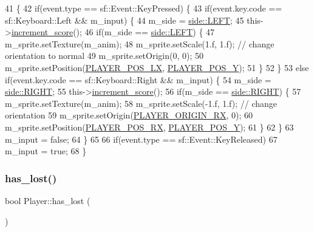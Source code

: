 \begin{DoxyCode}
41                                         \{
42     \textcolor{keywordflow}{if}(event.type == sf::Event::KeyPressed) \{
43         \textcolor{keywordflow}{if}(event.key.code == sf::Keyboard::Left && m\_input) \{
44             m\_side = \hyperlink{assets_8h_afc015eff6557e84151d2e53b94375445a684d325a7303f52e64011467ff5c5758}{side::LEFT};
45             this->\hyperlink{class_player_ab58df1547917c39756f063b0d57a1793}{increment\_score}();               
46             \textcolor{keywordflow}{if}(m\_side == \hyperlink{assets_8h_afc015eff6557e84151d2e53b94375445a684d325a7303f52e64011467ff5c5758}{side::LEFT}) \{
47                 m\_sprite.setTexture(m\_anim);
48                 m\_sprite.setScale(1.f, 1.f); \textcolor{comment}{// change orientation to normal}
49                 m\_sprite.setOrigin(0, 0);
50                 m\_sprite.setPosition(\hyperlink{player_8h_ac5c27f8ceb9550dd92443cd00605dc3e}{PLAYER\_POS\_LX}, \hyperlink{player_8h_a23e4a20c724cefdd69b13c2826a8c12f}{PLAYER\_POS\_Y});
51             \}
52         \}
53         \textcolor{keywordflow}{else} \textcolor{keywordflow}{if}(event.key.code == sf::Keyboard::Right && m\_input) \{
54             m\_side = \hyperlink{assets_8h_afc015eff6557e84151d2e53b94375445a21507b40c80068eda19865706fdc2403}{side::RIGHT};
55             this->\hyperlink{class_player_ab58df1547917c39756f063b0d57a1793}{increment\_score}();
56             \textcolor{keywordflow}{if}(m\_side == \hyperlink{assets_8h_afc015eff6557e84151d2e53b94375445a21507b40c80068eda19865706fdc2403}{side::RIGHT}) \{
57                 m\_sprite.setTexture(m\_anim);
58                 m\_sprite.setScale(-1.f, 1.f); \textcolor{comment}{// change orientation}
59                 m\_sprite.setOrigin(\hyperlink{player_8h_a654c17427cd994ed8ba0206bda8557cf}{PLAYER\_ORIGIN\_RX}, 0);
60                 m\_sprite.setPosition(\hyperlink{player_8h_af87a8f30ac734fbe3fcd0572bd0634d4}{PLAYER\_POS\_RX}, \hyperlink{player_8h_a23e4a20c724cefdd69b13c2826a8c12f}{PLAYER\_POS\_Y});
61             \}
62         \}
63         m\_input = \textcolor{keyword}{false};
64     \}
65 
66     \textcolor{keywordflow}{if}(event.type == sf::Event::KeyReleased)
67         m\_input = \textcolor{keyword}{true};
68 \}
\end{DoxyCode}
\mbox{\label{class_player_a734ead9fd1aa89c2574310425da18dc7}} 
\subsubsection{\texorpdfstring{has\+\_\+lost()}{has\_lost()}}
{\footnotesize\ttfamily bool Player\+::has\+\_\+lost (\begin{DoxyParamCaption}{ }\end{DoxyParamCaption})}



